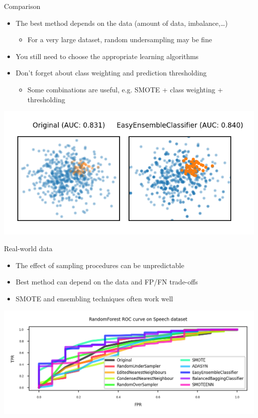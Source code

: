 \begin{frame}{Comparison}
\begin{itemize}
    \item The best method depends on the data (amount of data, imbalance,\dots)
    \begin{itemize}
        \item For a very large dataset, random undersampling may be fine
    \end{itemize}
    \item You still need to choose the appropriate learning algorithms
    \item Don't forget about class weighting and prediction thresholding
    \begin{itemize}
        \item Some combinations are useful, e.g. SMOTE + class weighting + thresholding
    \end{itemize}
\end{itemize}

\begin{center}
    \includegraphics[width=0.9\linewidth]{images/pre-processing/sampling-compare}
\end{center}
\end{frame}


\begin{frame}{Real-world data}
\begin{itemize}
    \item The effect of sampling procedures can be unpredictable
    \item Best method can depend on the data and FP/FN trade-offs
    \item SMOTE and ensembling techniques often work well
\end{itemize}

\begin{center}
    \includegraphics[width=0.95\linewidth]{images/pre-processing/sampling-effect}
\end{center}
\end{frame}
